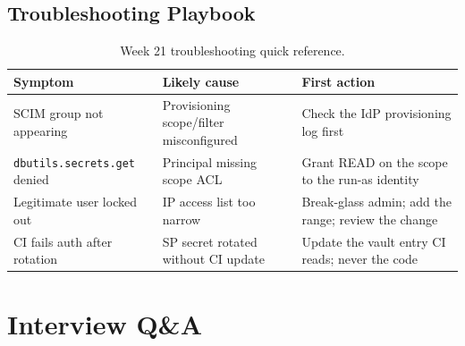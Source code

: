 \subsection{Troubleshooting Playbook}
\begin{table}[H]
\centering
\small
\begin{tabular}{@{}p{3.6cm}p{4.2cm}p{4.8cm}@{}}
\toprule
\textbf{Symptom} & \textbf{Likely cause} & \textbf{First action} \\
\midrule
SCIM group not appearing & Provisioning scope/filter misconfigured & Check the IdP provisioning log first \\
\texttt{dbutils.secrets.get} denied & Principal missing scope ACL & Grant READ on the scope to the run-as identity \\
Legitimate user locked out & IP access list too narrow & Break-glass admin; add the range; review the change \\
CI fails auth after rotation & SP secret rotated without CI update & Update the vault entry CI reads; never the code \\
\bottomrule
\end{tabular}
\caption{Week 21 troubleshooting quick reference.}
\label{tab:ch21-trouble}
\end{table}

\section{Interview Q\&A}
